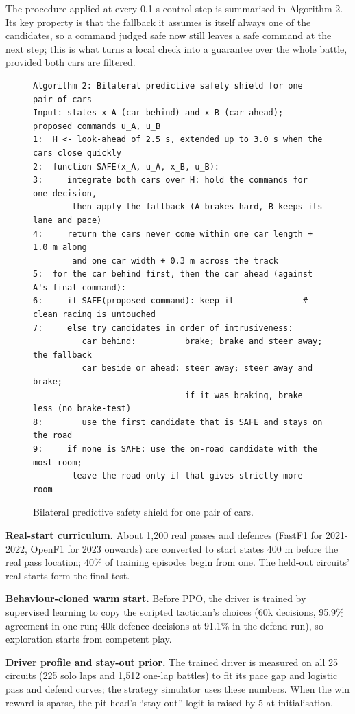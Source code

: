 \documentclass{ieeeaccess}
\begin{document}
The procedure applied at every 0.1 s control step is summarised in Algorithm 2. Its
key property is that the fallback it assumes is itself always one of the
candidates, so a command judged safe now still leaves a safe command at the next
step; this is what turns a local check into a guarantee over the whole battle,
provided both cars are filtered.

\begin{figure}[!t]
\footnotesize
\begin{verbatim}
Algorithm 2: Bilateral predictive safety shield for one pair of cars
Input: states x_A (car behind) and x_B (car ahead); proposed commands u_A, u_B
1:  H <- look-ahead of 2.5 s, extended up to 3.0 s when the cars close quickly
2:  function SAFE(x_A, u_A, x_B, u_B):
3:     integrate both cars over H: hold the commands for one decision,
        then apply the fallback (A brakes hard, B keeps its lane and pace)
4:     return the cars never come within one car length + 1.0 m along
        and one car width + 0.3 m across the track
5:  for the car behind first, then the car ahead (against A's final command):
6:     if SAFE(proposed command): keep it              # clean racing is untouched
7:     else try candidates in order of intrusiveness:
          car behind:          brake; brake and steer away; the fallback
          car beside or ahead: steer away; steer away and brake;
                               if it was braking, brake less (no brake-test)
8:        use the first candidate that is SAFE and stays on the road
9:     if none is SAFE: use the on-road candidate with the most room;
        leave the road only if that gives strictly more room
\end{verbatim}
\caption{Bilateral predictive safety shield for one pair of cars.}
\label{alg:2}
\end{figure}

\textbf{Real-start curriculum.} About 1,200 real passes and defences (FastF1 for 2021-
2022, OpenF1 for 2023 onwards) are converted to start states 400 m before the real
pass location; 40\% of training episodes begin from one. The held-out circuits'
real starts form the final test.

\textbf{Behaviour-cloned warm start.} Before PPO, the driver is trained by supervised
learning to copy the scripted tactician's choices (60k decisions, 95.9\% agreement
in one run; 40k defence decisions at 91.1\% in the defend run), so exploration starts
from competent play.

\textbf{Driver profile and stay-out prior.} The trained driver is measured on all 25
circuits (225 solo laps and 1,512 one-lap battles) to fit its pace gap and logistic
pass and defend curves; the strategy simulator uses these numbers. When the win
reward is sparse, the pit head's ``stay out'' logit is raised by 5 at initialisation.
\end{document}

